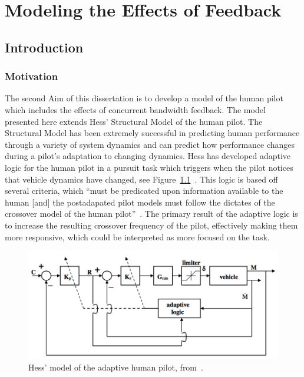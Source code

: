 \chapter{Modeling the Effects of Feedback}
\label{chapter:modeling}

\section{Introduction}

\subsection{Motivation}
The second Aim of this dissertation is to develop a model of the human pilot which includes the effects of concurrent bandwidth feedback.
The model presented here extends Hess' Structural Model of the human pilot.
The Structural Model has been extremely successful in predicting human performance through a variety of system dynamics and can predict how performance changes during a pilot's adaptation to changing dynamics.
Hess has developed adaptive logic for the human pilot in a pursuit task which triggers when the pilot notices that vehicle dynamics have changed, see Figure~\ref{figure:hesspursuit}~\citep{hess_modeling_2009}.
This logic is based off several criteria, which ``must be predicated upon information available to the human [and] the postadapated pilot models must follow the dictates of the crossover model of the human pilot''~\citep{hess_modeling_2009}.
The primary result of the adaptive logic is to increase the resulting crossover frequency of the pilot, effectively making them more responsive, which could be interpreted as more focused on the task.

\begin{figure}[tb]
    \begin{center}
        \includegraphics[width=0.8\linewidth]{figures/Modeling/Screen_Shot_2018-08-09_at_4_15_24_PM.png}
        \caption[Hess' model of the adaptive human pilot]{Hess' model of the adaptive human pilot, from~\citet{hess_modeling_2009}.}
        \label{figure:hesspursuit}
    \end{center}
\end{figure}

